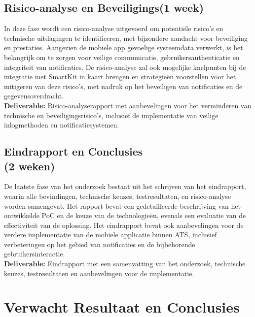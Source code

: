 \subsection{Risico-analyse en Beveiligings\overwegingen (1 week)}
\noindent In deze fase wordt een risico-analyse uitgevoerd om potentiële risico’s en technische uitdagingen te identificeren, met bijzondere aandacht voor beveiliging en prestaties. Aangezien de mobiele app gevoelige systeemdata verwerkt, is het belangrijk om te zorgen voor veilige communicatie, gebruikersauthenticatie en integriteit van notificaties. De risico-analyse zal ook mogelijke knelpunten bij de integratie met SmartKit in kaart brengen en strategieën voorstellen voor het mitigeren van deze risico’s, met nadruk op het beveiligen van notificaties en de gegevensoverdracht. \\

\noindent \textbf{Deliverable:} Risico-analyserapport met aanbevelingen voor het verminderen van technische en beveiligingsrisico’s, inclusief de implementatie van veilige inlogmethoden en notificatiesystemen.

\subsection{Eindrapport en Conclusies \\(2 weken)}
\noindent De laatste fase van het onderzoek bestaat uit het schrijven van het eindrapport, waarin alle bevindingen, technische keuzes, testresultaten, en risico-analyse worden samengevat. Het rapport bevat een gedetailleerde beschrijving van het ontwikkelde PoC en de keuze van de technologieën, evenals een evaluatie van de effectiviteit van de oplossing. Het eindrapport bevat ook aanbevelingen voor de verdere implementatie van de mobiele applicatie binnen ATS, inclusief verbeteringen op het gebied van notificaties en de bijbehorende gebruikersinteractie. \\

\noindent \textbf{Deliverable:} Eindrapport met een samenvatting van het onderzoek, technische keuzes, testresultaten en aanbevelingen voor de implementatie.



\section{Verwacht Resultaat en Conclusies}
\label{sec:verwachte_resultaten}


